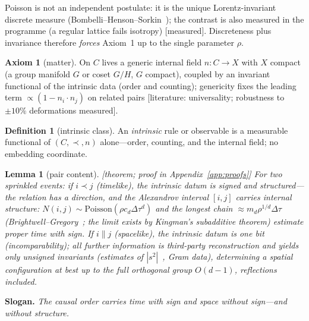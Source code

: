 \documentclass[aps,prd,reprint,nofootinbib,superscriptaddress,floatfix]{revtex4-2}
\newtheorem{lemma}{Lemma}
\theoremstyle{definition}
\newtheorem{axiom}{Axiom}
\newtheorem{definition}{Definition}
\begin{document}
Poisson is not an independent postulate: it is the unique Lorentz-invariant discrete
measure (Bombelli--Henson--Sorkin~\cite{BHS2009}); the contrast is also measured in the
programme (a regular lattice fails isotropy) [measured]. Discreteness plus invariance
therefore \emph{forces} Axiom~1 up to the single parameter $\rho$.

\begin{axiom}[matter]
On $C$ lives a generic internal field $n\colon C\to X$ with $X$ compact (a group
manifold $G$ or coset $G/H$, $G$ compact), coupled by an invariant functional of the
intrinsic data (order and counting); genericity fixes the leading term
$\propto(1-n_i\!\cdot n_j)$ on related pairs [literature: universality; robustness to
$\pm10\%$ deformations measured].
\end{axiom}

\begin{definition}[intrinsic class]
An \emph{intrinsic} rule or observable is a measurable functional of $(C,\prec,n)$
alone---order, counting, and the internal field; no embedding coordinate.
\end{definition}

\begin{lemma}[pair content]
\label{lem:pair}
{\rm[theorem; proof in Appendix~\ref{app:proofs}]} For two sprinkled events: if $i\prec j$ (timelike), the intrinsic datum is
\emph{signed and structured}---the relation has a direction, and the Alexandrov interval
$[i,j]$ carries internal structure: $N(i,j)\sim\mathrm{Poisson}(\rho c_d\Delta\tau^d)$
and the longest chain $\approx m_d\rho^{1/d}\Delta\tau$
(Brightwell--Gregory~\cite{BrightwellGregory1991}; the limit exists by Kingman's
subadditive theorem) estimate proper time \emph{with sign}. If $i\parallel j$
(spacelike), the intrinsic datum is \emph{one bit} (incomparability); all further
information is third-party reconstruction and yields only \emph{unsigned} invariants
(estimates of $|s^2|$~\cite{RideoutWallden2009}, Gram data), determining a spatial
configuration at best up to the full orthogonal group $O(d-1)$, reflections included.
\end{lemma}

\noindent\textbf{Slogan.} \emph{The causal order carries time with sign and space
without sign---and without structure.}
\end{document}

